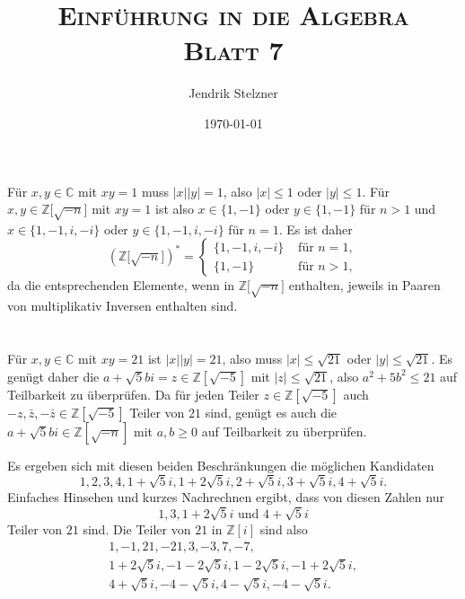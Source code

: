 \documentclass[a4paper,10pt]{article}
\title{\textsc{Einführung in die Algebra \\ \Large Blatt 7}}
\author{Jendrik Stelzner}
\date{\today}
\theoremstyle{definition}
\newcommand{\Z}{\mathbb{Z}}
\newcommand{\C}{\mathbb{C}}
\begin{document}
\maketitle





\section{}
Für $x,y \in \C$ mit $xy = 1$ muss $|x||y| = 1$, also $|x| \leq 1$ oder $|y| \leq 1$. Für $x,y \in \Z\Big[\sqrt{-n}\Big]$ mit $xy = 1$ ist also $x \in \{1,-1\}$ oder $y \in \{1,-1\}$ für $n > 1$ und $x \in \{1,-1,i,-i\}$ oder $y \in \{1,-1,i,-i\}$ für $n=1$. Es ist daher
\[
 \left(\Z\Big[\sqrt{-n}\Big]\right)^* =
 \begin{cases}
  \{1,-1,i,-i\} & \text{ für } n = 1, \\
  \{1,-1\}      & \text{ für } n > 1,
 \end{cases}
\]
da die entsprechenden Elemente, wenn in $\Z\Big[\sqrt{-n}\Big]$ enthalten, jeweils in Paaren von multiplikativ Inversen enthalten sind.






\section{}
Für $x,y \in \C$ mit $xy=21$ ist $|x||y| = 21$, also muss $|x| \leq \sqrt{21}$ oder $|y| \leq \sqrt{21}$. Es genügt daher die $a+\sqrt{5}bi = z \in \Z[\sqrt{-5}]$ mit $|z| \leq \sqrt{21}$, also $a^2 + 5b^2 \leq 21$ auf Teilbarkeit zu überprüfen. Da für jeden Teiler $z \in \Z[\sqrt{-5}]$ auch $-z, \bar{z}, -\bar{z} \in \Z[\sqrt{-5}]$ Teiler von $21$ sind, genügt es auch die $a+\sqrt{5}bi \in \Z[\sqrt{-n}]$ mit $a,b \geq 0$ auf Teilbarkeit zu überprüfen.

Es ergeben sich mit diesen beiden Beschränkungen die möglichen Kandidaten
\[
 1, 2, 3, 4, 1+\sqrt{5}i, 1+2\sqrt{5}i, 2+\sqrt{5}i, 3+\sqrt{5}i, 4+\sqrt{5}i.
\]
Einfaches Hinsehen und kurzes Nachrechnen ergibt, dass von diesen Zahlen nur
\[
 1, 3, 1+2\sqrt{5}i \text{ und } 4+\sqrt{5}i
\]
Teiler von $21$ sind. Die Teiler von $21$ in $\Z[i]$ sind also
\begin{gather*}
 1, -1, 21, -21, 3, -3, 7, -7, \\
 1+2\sqrt{5}i, -1-2\sqrt{5}i, 1-2\sqrt{5}i, -1+2\sqrt{5}i, \\
 4+\sqrt{5}i, -4-\sqrt{5}i, 4-\sqrt{5}i, -4-\sqrt{5}i.
\end{gather*}
\end{document}
